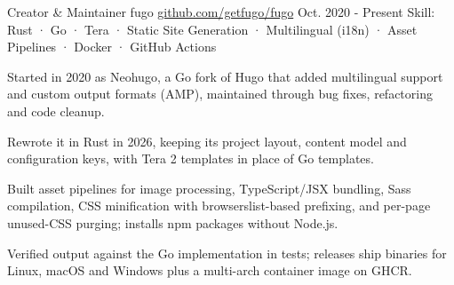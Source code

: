 

\begin{cventries}

  \cventry
    {Creator \& Maintainer} %
    {fugo} %
    {\href{https://github.com/getfugo/fugo}{github.com/getfugo/fugo}} %
    {Oct. 2020 - Present} %
    {Skill: Rust · Go · Tera · Static Site Generation · Multilingual (i18n) · Asset Pipelines · Docker · GitHub Actions} %
    {
      \begin{cvitems} %
        \item {Started in 2020 as Neohugo, a Go fork of Hugo that added multilingual support and custom output formats (AMP), maintained through bug fixes, refactoring and code cleanup.}
        \item {Rewrote it in Rust in 2026, keeping its project layout, content model and configuration keys, with Tera 2 templates in place of Go templates.}
        \item {Built asset pipelines for image processing, TypeScript/JSX bundling, Sass compilation, CSS minification with browserslist-based prefixing, and per-page unused-CSS purging; installs npm packages without Node.js.}
        \item {Verified output against the Go implementation in tests; releases ship binaries for Linux, macOS and Windows plus a multi-arch container image on GHCR.}
      \end{cvitems}
    }


\end{cventries}
